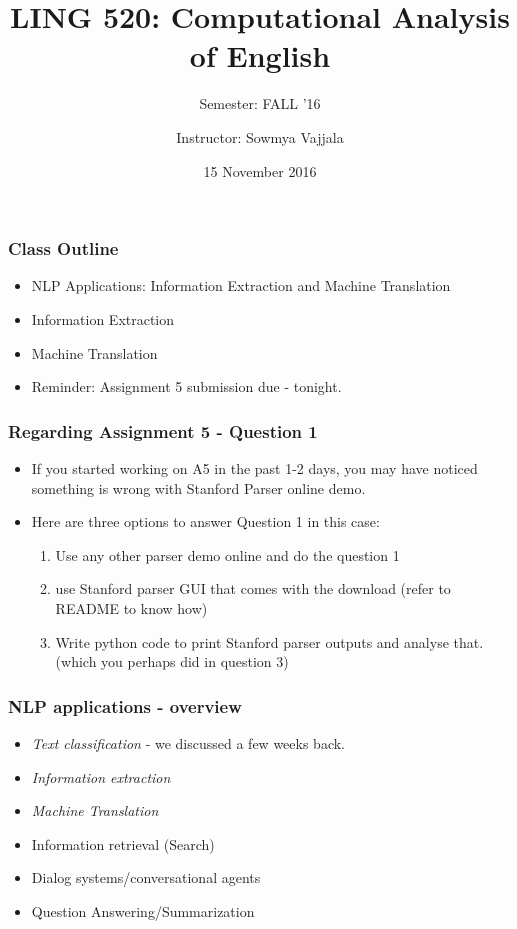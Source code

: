 \documentclass{beamer}
\author[Sowmya Vajjala]{Instructor: Sowmya Vajjala}
\title[LING 520]{LING 520: Computational Analysis of English}
\subtitle{Semester: FALL '16}
\date{15 November 2016}
\institute{Iowa State University, USA}
\begin{document}
\begin{frame}\titlepage
\end{frame}

\begin{frame}
\frametitle{Class Outline}
\begin{itemize}
\item NLP Applications: Information Extraction and Machine Translation %
\item Information Extraction %
\item Machine Translation %
\item Reminder: Assignment 5 submission due - tonight.
\end{itemize}
\end{frame}

\begin{frame}
\frametitle{Regarding Assignment 5 - Question 1}
\begin{itemize}
\item If you started working on A5 in the past 1-2 days, you may have noticed something is wrong with Stanford Parser online demo.
\item Here are three options to answer Question 1 in this case:
\begin{enumerate}
\item Use any other parser demo online and do the question 1
\item use Stanford parser GUI that comes with the download (refer to README to know how)
\item Write python code to print Stanford parser outputs and analyse that. (which you perhaps did in question 3)
\end{enumerate}
\end{itemize}
\end{frame}

\begin{frame}
\frametitle{NLP applications - overview}
\begin{itemize}
\item \textit{Text classification} - we discussed a few weeks back.
\item \textit{Information extraction}
\item \textit{Machine Translation}
\item Information retrieval (Search)
\item Dialog systems/conversational agents
\item Question Answering/Summarization
\end{itemize}
\end{frame}
\end{document}
